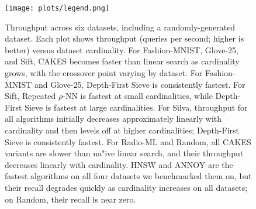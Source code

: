 


\begin{figure}[h]
    \centering
  
  
  
    \vspace{2pt}
    \texttt{[image: plots/legend.png]}
  
    \caption{Throughput across six datasets, including a randomly-generated dataset.
    Each plot shows throughput (queries per second; higher is better) versus dataset cardinality. For Fashion-MNIST, Glove-25, and Sift, CAKES becomes faster than linear search as cardinality grows, with the crossover point varying by dataset. For Fashion-MNIST and Glove-25, Depth-First Sieve is consistently fastest. For Sift, Repeated $\rho$-NN is fastest at small cardinalities, while Depth-First Sieve is fastest at large cardinalities. For Silva, throughput for all algorithms initially decreases approximately linearly with cardinality and then levels off at higher cardinalities; Depth-First Sieve is consistently fastest. For Radio-ML and Random, all CAKES variants are slower than na"{i}ve linear search, and their throughput decreases linearly with cardinality. HNSW and ANNOY are the fastest algorithms on all four datasets we benchmarked them on, but their recall degrades quickly as cardinality increases on all datasets; on Random, their recall is near zero.}
    \label{fig:results:scaling-plots}
  \end{figure}


